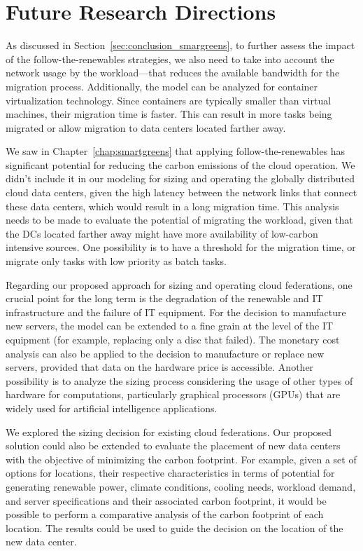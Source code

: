 \section{Future Research Directions}

\label{sec:conclusion_future_research}

As discussed in Section~\ref{sec:conclusion_smargreens}, to further assess the impact of the follow-the-renewables strategies, we also need to take into account the network usage by the workload---that reduces the available bandwidth for the migration process. Additionally, the model can be analyzed for container virtualization technology. Since containers are typically smaller than virtual machines, their migration time is faster. This can result in more tasks being migrated or allow migration to data centers located farther away.


We saw in Chapter~\ref{chap:smartgreens} that applying follow-the-renewables has significant potential for reducing the carbon emissions of the cloud operation. We didn't include it in our modeling for sizing and operating the globally distributed cloud data centers, given the high latency between the network links that connect these data centers, which would result in a long migration time. This analysis needs to be made to evaluate the potential of migrating the workload, given that the DCs located farther away might have more availability of low-carbon intensive sources. One possibility is to have a threshold for the migration time, or migrate only tasks with low priority as batch tasks.


Regarding our proposed approach for sizing and operating cloud federations, one crucial point for the long term is the degradation of the renewable and IT infrastructure and the failure of IT equipment. For the decision to manufacture new servers, the model can be extended to a fine grain at the level of the IT equipment (for example, replacing only a disc that failed). The monetary cost analysis can also be applied to the decision to manufacture or replace new servers, provided that data on the hardware price is accessible. Another possibility is to analyze the sizing process considering the usage of other types of hardware for computations, particularly graphical processors (GPUs) that are widely used for artificial intelligence applications.

We explored the sizing decision for existing cloud federations. Our proposed solution could also be extended to evaluate the placement of new data centers with the objective of minimizing the carbon footprint. For example, given a set of options for locations, their respective characteristics in terms of potential for generating renewable power, climate conditions, cooling needs, workload demand, and server specifications and their associated carbon footprint, it would be possible to perform a comparative analysis of the carbon footprint of each location. The results could be used to guide the decision on the location of the new data center.

